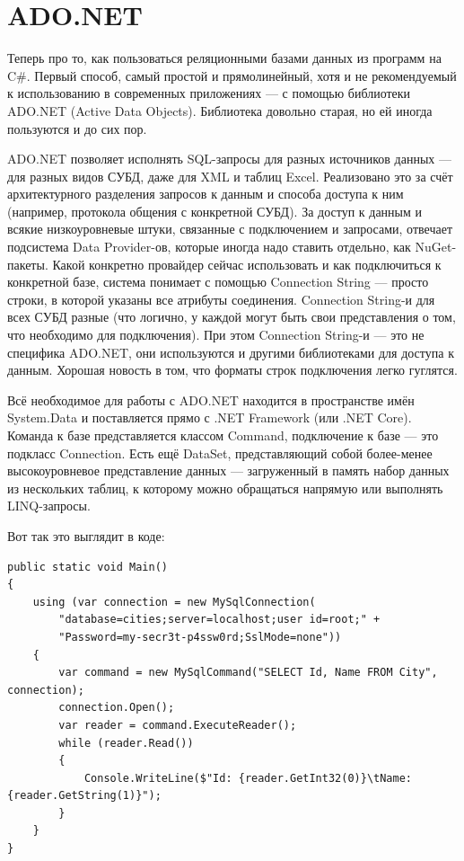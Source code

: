 \documentclass[a5paper]{article}
\begin{document}
\section{ADO.NET}

Теперь про то, как пользоваться реляционными базами данных из программ на C\#. Первый способ, самый простой и прямолинейный, хотя и не рекомендуемый к использованию в современных приложениях --- с помощью библиотеки ADO.NET (Active Data Objects). Библиотека довольно старая, но ей иногда пользуются и до сих пор.

ADO.NET позволяет исполнять SQL-запросы для разных источников данных --- для разных видов СУБД, даже для XML и таблиц Excel. Реализовано это за счёт архитектурного разделения запросов к данным и способа доступа к ним (например, протокола общения с конкретной СУБД). За доступ к данным и всякие низкоуровневые штуки, связанные с подключением и запросами, отвечает подсистема Data Provider-ов, которые иногда надо ставить отдельно, как NuGet-пакеты. Какой конкретно провайдер сейчас использовать и как подключиться к конкретной базе, система понимает с помощью Connection String --- просто строки, в которой указаны все атрибуты соединения. Connection String-и для всех СУБД разные (что логично, у каждой могут быть свои представления о том, что необходимо для подключения). При этом Connection String-и --- это не специфика ADO.NET, они используются и другими библиотеками для доступа к данным. Хорошая новость в том, что форматы строк подключения легко гуглятся.

Всё необходимое для работы с ADO.NET находится в пространстве имён System.Data и поставляется прямо с .NET Framework (или .NET Core). Команда к базе представляется классом Command, подключение к базе --- это подкласс Connection. Есть ещё DataSet, представляющий собой более-менее высокоуровневое представление данных --- загруженный в память набор данных из нескольких таблиц, к которому можно обращаться напрямую или выполнять LINQ-запросы.

Вот так это выглядит в коде:

\begin{verbatim}
public static void Main()
{
    using (var connection = new MySqlConnection(
        "database=cities;server=localhost;user id=root;" + 
        "Password=my-secr3t-p4ssw0rd;SslMode=none"))
    {
        var command = new MySqlCommand("SELECT Id, Name FROM City", connection);
        connection.Open();
        var reader = command.ExecuteReader();
        while (reader.Read())
        {
            Console.WriteLine($"Id: {reader.GetInt32(0)}\tName:{reader.GetString(1)}");
        }
    }
}
\end{verbatim}
\end{document}
